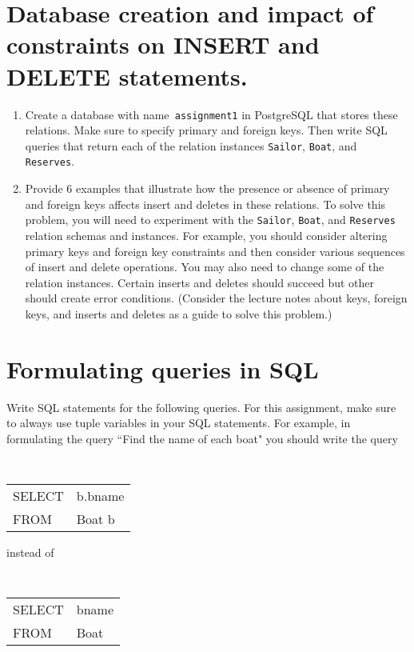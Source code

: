 \section{Database creation and impact of constraints on INSERT and DELETE statements.}
\begin{enumerate}
\item Create a database with name{\tt\ assignment1} in PostgreSQL that stores these relations.
  Make sure to specify primary and foreign keys.
  Then write SQL queries that return each of the relation instances {\tt Sailor}, {\tt Boat}, and {\tt Reserves}.
\item Provide 6 examples that illustrate how the presence or absence of primary and
  foreign keys affects insert and deletes in these relations.   To solve this problem,
  you will need to experiment with the  {\tt Sailor}, {\tt Boat}, and {\tt Reserves} relation schemas and instances.   For example, 
  you should consider altering primary keys and foreign key constraints and
  then consider various sequences of insert and delete operations.   You may also need to change some of the
  relation instances.
  Certain inserts and deletes should succeed but other should create error conditions.
  (Consider the lecture notes about keys, foreign keys, and inserts and deletes as a guide to solve this problem.)
  \end{enumerate}
  \section{Formulating queries in SQL}\label{SQLQueries}
Write SQL statements for the following queries.   For this assignment,
make sure to always use  tuple variables in your SQL statements.    
For example, in formulating the query ``Find the name of each boat" you should write the query

\begin{center}{\tt
\begin{tabular}{ll}
SELECT &b.bname\\
FROM & Boat b
\end{tabular}}
\end{center}
instead of
\begin{center}{\tt
\begin{tabular}{ll}
SELECT &bname\\
FROM & Boat 
\end{tabular}}
\end{center}

